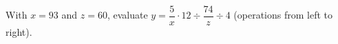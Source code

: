 With $x=93$ and $z=60$, evaluate $y=\dfrac5x\cdot12\div\dfrac{74}z\div4$ (operations from left to right).
